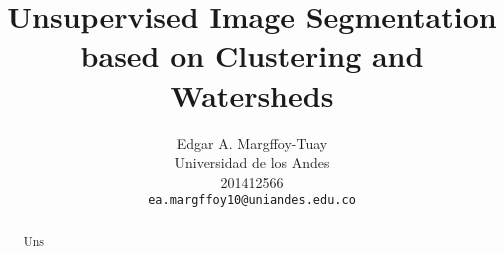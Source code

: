 \documentclass[10pt,twocolumn,letterpaper]{article}
\begin{document}
\title{Unsupervised Image Segmentation based on Clustering and Watersheds}

\author{Edgar A. Margffoy-Tuay\\
Universidad de los Andes\\
201412566\\
{\tt\small ea.margffoy10@uniandes.edu.co}
}

\maketitle

\begin{abstract}
Uns
\end{abstract}


\end{document}

